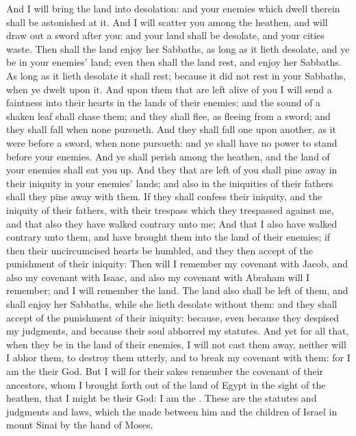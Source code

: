 \begin{biblechapter}
\verse And I will bring the land into desolation: and your enemies which dwell therein shall be astonished at it.
\verse And I will scatter you among the heathen, and will draw out a sword after you: and your land shall be desolate, and your cities waste.
\verse Then shall the land enjoy her Sabbaths, as long as it lieth desolate, and ye be in your enemies' land; even then shall the land rest, and enjoy her Sabbaths.
\verse As long as it lieth desolate it shall rest; because it did not rest in your Sabbaths, when ye dwelt upon it.
\verse And upon them that are left alive of you I will send a faintness into their hearts in the lands of their enemies; and the sound of a shaken leaf shall chase them; and they shall flee, as fleeing from a sword; and they shall fall when none pursueth.
\verse And they shall fall one upon another, as it were before a sword, when none pursueth: and ye shall have no power to stand before your enemies.
\verse And ye shall perish among the heathen, and the land of your enemies shall eat you up.
\verse And they that are left of you shall pine away in their iniquity in your enemies' lands; and also in the iniquities of their fathers shall they pine away with them.
\verse If they shall confess their iniquity, and the iniquity of their fathers, with their trespass which they trespassed against me, and that also they have walked contrary unto me;
\verse And that I also have walked contrary unto them, and have brought them into the land of their enemies; if then their uncircumcised hearts be humbled, and they then accept of the punishment of their iniquity:
\verse Then will I remember my covenant with Jacob, and also my covenant with Isaac, and also my covenant with Abraham will I remember; and I will remember the land.
\verse The land also shall be left of them, and shall enjoy her Sabbaths, while she lieth desolate without them: and they shall accept of the punishment of their iniquity: because, even because they despised my judgments, and because their soul abhorred my statutes.
\verse And yet for all that, when they be in the land of their enemies, I will not cast them away, neither will I abhor them, to destroy them utterly, and to break my covenant with them: for I am the \LORD their God.
\verse But I will for their sakes remember the covenant of their ancestors, whom I brought forth out of the land of Egypt in the sight of the heathen, that I might be their God: I am the \LORD.
\verse These are the statutes and judgments and laws, which the \LORD made between him and the children of Israel in mount Sinai by the hand of Moses.
\end{biblechapter}


